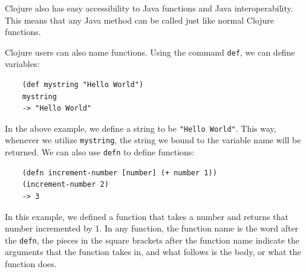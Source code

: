\documentclass[12pt]{article}
\newcommand{\comment}[1]{{\bf \tt  {#1}}}
\newcommand{\emcomment}[1]{\textcolor{ForestGreen}{\comment{Elena: {#1}}}}
\begin{document}
Clojure also has easy accessibility to Java functions and Java
interoperability. This means that any Java method can be called just
like normal Clojure functions.


Clojure users can also name functions.
Using the command \texttt{def}, we can define variables:
\begin{verbatim}
	(def mystring "Hello World")
	mystring
	-> "Hello World"
\end{verbatim}

In the above example, we define a string to be \texttt{"Hello World"}. This way, whenever we utilize 
\texttt{mystring}, the string we bound to the variable name will be returned. We can also use
\texttt{defn} to define functions:
\begin{verbatim}
	(defn increment-number [number] (+ number 1))
	(increment-number 2)
	-> 3
\end{verbatim}

In this example, we defined
a function that takes a number and returns that number incremented by 1.
In any function, the function name is the word after the \texttt{defn}, the pieces in the square
brackets after the function name indicate 
the arguments that the function takes in, and what follows is the body, or what the function does.
\end{document}
